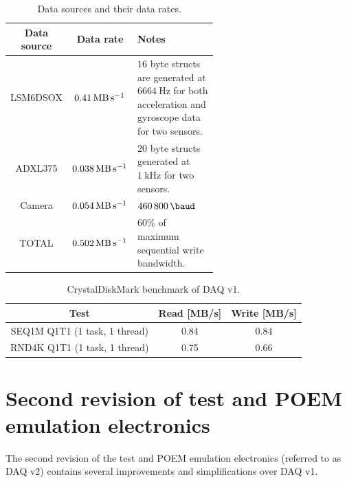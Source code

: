 \documentclass[a4paper,11pt]{article}
\begin{document}
\begin{table}[H]
  \centering
  \label{tabl:daq-v1-sensor-datarate}
  \begin{tabular}{|c|c|p{0.6\linewidth}|}
    Data source & Data rate                           & Notes                                                                                                            \\
    \hline
    LSM6DSOX    & $\SI{0.41}{\mega\byte\per\second}$  & $16$ byte structs are generated at $\SI{6664}{\hertz}$ for both acceleration and gyroscope data for two sensors. \\
    ADXL375     & $\SI{0.038}{\mega\byte\per\second}$ & $20$ byte structs generated at $\SI{1}{\kilo\hertz}$ for two sensors.                                            \\
    Camera      & $\SI{0.054}{\mega\byte\per\second}$ & $\SI{460800}{\baud}$                                                                                             \\
    TOTAL       & $\SI{0.502}{\mega\byte\per\second}$ & $60\%$ of maximum sequential write bandwidth.
  \end{tabular}
  \caption{Data sources and their data rates.}
\end{table}

\begin{table}[H]
  \centering
  \begin{tabular}{|c|c|c|}
    Test                          & Read [MB/s] & Write [MB/s] \\
    \hline
    SEQ1M Q1T1 (1 task, 1 thread) & 0.84        & 0.84         \\
    RND4K Q1T1 (1 task, 1 thread) & 0.75        & 0.66         \\
  \end{tabular}
  \caption{CrystalDiskMark benchmark of DAQ v1.}
  \label{tabl:daq-v1-diskmark}
\end{table}

\section{Second revision of test and POEM emulation electronics}
The second revision of the test and POEM emulation electronics (referred to as DAQ v2) contains several improvements and simplifications over DAQ v1.
\end{document}
